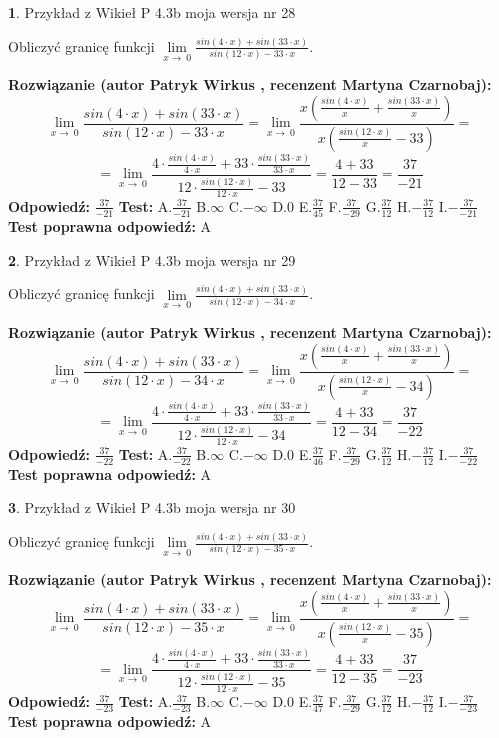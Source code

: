 \documentclass[12pt, a4paper]{article}
\theoremstyle{definition} %
\newtheorem{zad}{}
\newcommand{\zadStart}[1]{\begin{zad}#1\newline}
\newcommand{\zadStop}{\end{zad}}
\newcommand{\rozwStart}[2]{\noindent \textbf{Rozwiązanie (autor #1 , recenzent #2): }\newline}
\newcommand{\rozwStop}{\newline}
\newcommand{\odpStart}{\noindent \textbf{Odpowiedź:}\newline}
\newcommand{\odpStop}{\newline}
\newcommand{\testStart}{\noindent \textbf{Test:}\newline}
\newcommand{\testStop}{\newline}
\newcommand{\kluczStart}{\noindent \textbf{Test poprawna odpowiedź:}\newline}
\newcommand{\kluczStop}{\newline}
\begin{document}
\zadStart{Przykład z Wikieł P 4.3b moja wersja nr 28}


Obliczyć granicę funkcji $\lim\limits_{x\to\ 0}\frac{sin(4 \cdot x)+sin(33 \cdot x)}{sin(12 \cdot x)-33 \cdot x}$.
\zadStop
\rozwStart{Patryk Wirkus}{Martyna Czarnobaj}
$$\lim\limits_{x\to\ 0}\frac{sin(4 \cdot x)+sin(33 \cdot x)}{sin(12 \cdot x)-33 \cdot x}=\lim\limits_{x\to\ 0}\frac{x(\frac{sin(4 \cdot x)}{x}+\frac{sin(33 \cdot x)}{x})}{x(\frac{sin(12 \cdot x)}{x}-33)}=$$
$$=\lim\limits_{x\to\ 0}\frac{4 \cdot \frac{sin(4 \cdot x)}{4 \cdot x}+33 \cdot \frac{sin(33 \cdot x)}{33 \cdot x}}{12 \cdot \frac{sin(12 \cdot x)}{12 \cdot x}-33}=\frac{4+33}{12-33} = \frac{37}{-21}$$
\rozwStop
\odpStart
$\frac{37}{-21}$
\odpStop
\testStart
A.$\frac{37}{-21}$
B.$\infty$
C.$-\infty$
D.$0$
E.$\frac{37}{45}$
F.$\frac{37}{-29}$
G.$\frac{37}{12}$
H.$-\frac{37}{12}$
I.$-\frac{37}{-21}$
\testStop
\kluczStart
A
\kluczStop



\zadStart{Przykład z Wikieł P 4.3b moja wersja nr 29}


Obliczyć granicę funkcji $\lim\limits_{x\to\ 0}\frac{sin(4 \cdot x)+sin(33 \cdot x)}{sin(12 \cdot x)-34 \cdot x}$.
\zadStop
\rozwStart{Patryk Wirkus}{Martyna Czarnobaj}
$$\lim\limits_{x\to\ 0}\frac{sin(4 \cdot x)+sin(33 \cdot x)}{sin(12 \cdot x)-34 \cdot x}=\lim\limits_{x\to\ 0}\frac{x(\frac{sin(4 \cdot x)}{x}+\frac{sin(33 \cdot x)}{x})}{x(\frac{sin(12 \cdot x)}{x}-34)}=$$
$$=\lim\limits_{x\to\ 0}\frac{4 \cdot \frac{sin(4 \cdot x)}{4 \cdot x}+33 \cdot \frac{sin(33 \cdot x)}{33 \cdot x}}{12 \cdot \frac{sin(12 \cdot x)}{12 \cdot x}-34}=\frac{4+33}{12-34} = \frac{37}{-22}$$
\rozwStop
\odpStart
$\frac{37}{-22}$
\odpStop
\testStart
A.$\frac{37}{-22}$
B.$\infty$
C.$-\infty$
D.$0$
E.$\frac{37}{46}$
F.$\frac{37}{-29}$
G.$\frac{37}{12}$
H.$-\frac{37}{12}$
I.$-\frac{37}{-22}$
\testStop
\kluczStart
A
\kluczStop



\zadStart{Przykład z Wikieł P 4.3b moja wersja nr 30}


Obliczyć granicę funkcji $\lim\limits_{x\to\ 0}\frac{sin(4 \cdot x)+sin(33 \cdot x)}{sin(12 \cdot x)-35 \cdot x}$.
\zadStop
\rozwStart{Patryk Wirkus}{Martyna Czarnobaj}
$$\lim\limits_{x\to\ 0}\frac{sin(4 \cdot x)+sin(33 \cdot x)}{sin(12 \cdot x)-35 \cdot x}=\lim\limits_{x\to\ 0}\frac{x(\frac{sin(4 \cdot x)}{x}+\frac{sin(33 \cdot x)}{x})}{x(\frac{sin(12 \cdot x)}{x}-35)}=$$
$$=\lim\limits_{x\to\ 0}\frac{4 \cdot \frac{sin(4 \cdot x)}{4 \cdot x}+33 \cdot \frac{sin(33 \cdot x)}{33 \cdot x}}{12 \cdot \frac{sin(12 \cdot x)}{12 \cdot x}-35}=\frac{4+33}{12-35} = \frac{37}{-23}$$
\rozwStop
\odpStart
$\frac{37}{-23}$
\odpStop
\testStart
A.$\frac{37}{-23}$
B.$\infty$
C.$-\infty$
D.$0$
E.$\frac{37}{47}$
F.$\frac{37}{-29}$
G.$\frac{37}{12}$
H.$-\frac{37}{12}$
I.$-\frac{37}{-23}$
\testStop
\kluczStart
A
\kluczStop
\end{document}
